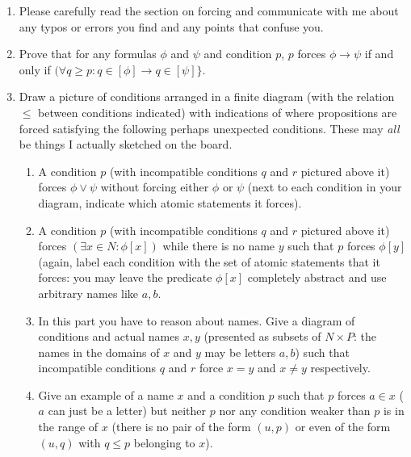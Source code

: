 \documentclass[12pt]{book}
\begin{document}
\begin{enumerate}

\item Please carefully read the section on forcing and communicate with me about any typos or errors you find and any points that confuse you.

\item  Prove that for any formulas $\phi$ and $\psi$ and condition $p$, $p$ forces $\phi \rightarrow \psi$ if and only if $(\forall q \geq p : q \in [\phi] \rightarrow q \in [\psi]\}$.

\item Draw a picture of conditions arranged in a finite diagram (with the relation $\leq$ between conditions indicated) with indications of where propositions are forced satisfying the following perhaps unexpected conditions.  These may {\em all\/} be things I actually sketched on the board.

\begin{enumerate}

\item  A condition $p$ (with incompatible conditions $q$ and $r$ pictured above it) forces $\phi \vee \psi$ without forcing either $\phi$ or $\psi$ (next to each condition in your diagram, indicate which atomic statements it forces).

\item  A condition $p$ (with incompatible conditions $q$ and $r$ pictured above it) forces $(\exists x \in N:\phi[x])$ while there is no name $y$ such that
$p$ forces $\phi[y]$ (again, label each condition with the set of atomic statements that it forces:  you may leave the predicate $\phi[x]$ completely abstract and use arbitrary names like $a,b$.

\item  In this part you have to reason about names.  Give a diagram of conditions and actual names $x,y$ (presented as subsets of $N \times P$:  the names in the domains of $x$ and $y$ may be letters $a,b$) such that incompatible conditions $q$ and $r$ force $x=y$ and $x \neq y$ respectively.

\item  Give an example of a name $x$ and a condition $p$ such that $p$ forces $a \in x$ ($a$ can just be a letter) but neither $p$ nor any condition weaker than $p$ is in the range of $x$
(there is no pair of the form $(u,p)$ or even of the form $(u,q)$ with $q \leq p$ belonging to $x$).

\end{enumerate}


\end{enumerate}
\end{document}
